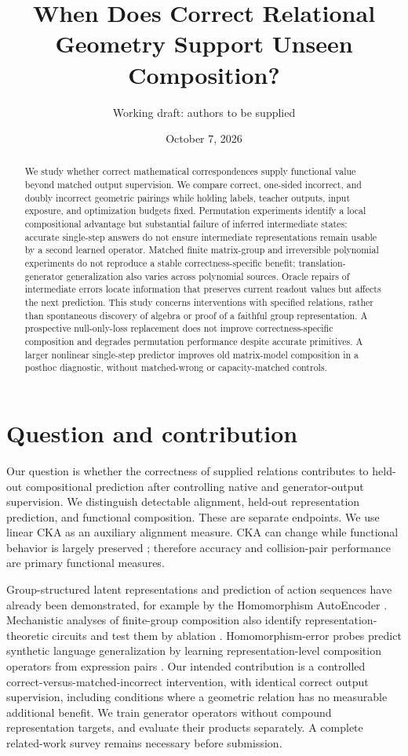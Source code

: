 \documentclass[11pt]{article}
\title{When Does Correct Relational Geometry Support Unseen Composition?}
\author{Working draft: authors to be supplied}
\date{October 7, 2026}
\begin{document}
\maketitle
\begin{abstract}
We study whether correct mathematical correspondences supply functional value beyond matched output supervision. We compare correct, one-sided incorrect, and doubly incorrect geometric pairings while holding labels, teacher outputs, input exposure, and optimization budgets fixed. Permutation experiments identify a local compositional advantage but substantial failure of inferred intermediate states: accurate single-step answers do not ensure intermediate representations remain usable by a second learned operator. Matched finite matrix-group and irreversible polynomial experiments do not reproduce a stable correctness-specific benefit; translation-generator generalization also varies across polynomial sources. Oracle repairs of intermediate errors locate information that preserves current readout values but affects the next prediction. This study concerns interventions with specified relations, rather than spontaneous discovery of algebra or proof of a faithful group representation.
A prospective null-only-loss replacement does not improve correctness-specific composition and degrades permutation performance despite accurate primitives. A larger nonlinear single-step predictor improves old matrix-model composition in a posthoc diagnostic, without matched-wrong or capacity-matched controls.
\end{abstract}

\section{Question and contribution}
Our question is whether the correctness of supplied relations contributes to held-out compositional prediction after controlling native and generator-output supervision. We distinguish detectable alignment, held-out representation prediction, and functional composition. These are separate endpoints. We use linear CKA \cite{kornblith2019} as an auxiliary alignment measure. CKA can change while functional behavior is largely preserved \cite{davari2022}; therefore accuracy and collision-pair performance are primary functional measures.

Group-structured latent representations and prediction of action sequences have already been demonstrated, for example by the Homomorphism AutoEncoder \cite{keurti2023}. Mechanistic analyses of finite-group composition also identify representation-theoretic circuits and test them by ablation \cite{chughtai2023}. Homomorphism-error probes predict synthetic language generalization by learning representation-level composition operators from expression pairs \cite{an2026}. Our intended contribution is a controlled correct-versus-matched-incorrect intervention, with identical correct output supervision, including conditions where a geometric relation has no measurable additional benefit. We train generator operators without compound representation targets, and evaluate their products separately. A complete related-work survey remains necessary before submission.
\end{document}

